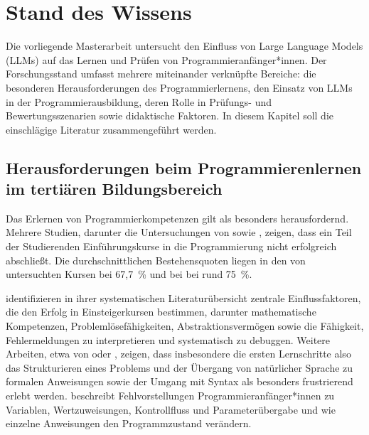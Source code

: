 \chapter{Stand des Wissens} \label{cha:standDesWissens}

Die vorliegende Masterarbeit untersucht den Einfluss von Large Language Models (LLMs) auf das Lernen und Prüfen von Programmieranfänger*innen. Der Forschungsstand umfasst mehrere miteinander verknüpfte Bereiche: die besonderen Herausforderungen des Programmierlernens, den Einsatz von LLMs in der Programmierausbildung, deren Rolle in Prüfungs- und Bewertungsszenarien sowie didaktische Faktoren. In diesem Kapitel soll die einschlägige Literatur zusammengeführt werden.

\section{Herausforderungen beim Programmierenlernen im tertiären Bildungsbereich}
Das Erlernen von Programmierkompetenzen gilt als besonders herausfordernd. Mehrere Studien, darunter die Untersuchungen von \textcite{WatsonLi2014FailureRates} sowie \textcite{Simon2019PassRates}, zeigen, dass ein Teil der Studierenden Einführungskurse in die Programmierung nicht erfolgreich abschließt. Die durchschnittlichen Bestehensquoten liegen in den von \textcite{WatsonLi2014FailureRates} untersuchten Kursen bei 67,7~\% und bei \textcite{Simon2019PassRates} bei rund 75~\%.

\textcite[S.~6]{SystematicLiteratureReview2019} identifizieren in ihrer systematischen Literaturübersicht zentrale Einflussfaktoren, die den Erfolg in Einsteigerkursen bestimmen, darunter mathematische Kompetenzen, Problemlösefähigkeiten, Abstraktionsvermögen sowie die Fähigkeit, Fehlermeldungen zu interpretieren und systematisch zu debuggen. Weitere Arbeiten, etwa von \textcite[S.~2]{TeachingIntroductoryQuantitive} oder \textcite[S.~1]{studentPerformance}, zeigen, dass insbesondere die ersten Lernschritte also das Strukturieren eines Problems und der Übergang von natürlicher Sprache zu formalen Anweisungen sowie der Umgang mit Syntax als besonders frustrierend erlebt werden. \textcite[S.~5-7]{Sorva2013NotionalMachines} beschreibt Fehlvorstellungen Programmieranfänger*innen zu Variablen, Wertzuweisungen, Kontrollfluss und Parameterübergabe und wie einzelne Anweisungen den Programmzustand verändern.

